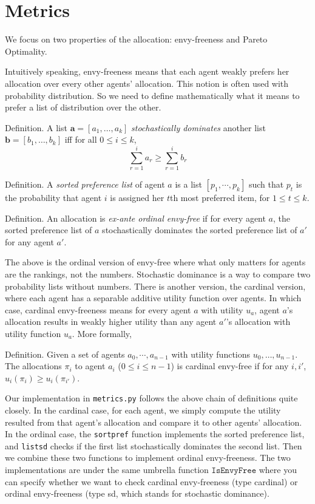 \documentclass[12pt]{article}
\begin{document}
\section*{Metrics}

We focus on two properties of the allocation: envy-freeness and Pareto Optimality. 

Intuitively speaking, envy-freeness means that each agent weakly prefers her allocation over every other agents' allocation. This notion is often used with probability distribution. So we need to define mathematically what it means to prefer a list of distribution over the other.

Definition. A list $\mathbf{a} = [a_1, \dots, a_k]$ \textit{stochastically dominates} another list $\mathbf{b} = [b_1, \dots, b_k]$ iff for all $0 \leq i \leq k$, $$ \sum_{r=1}^i a_r \geq \sum_{r=1}^i b_r $$

Definition. A \textit{sorted preference list} of agent $a$ is a list $[p_1, \cdots, p_k]$ such that $p_t$ is the probability that agent $i$ is assigned her $t$th most preferred item, for $1 \leq t \leq k$.

Definition. An allocation is \textit{ex-ante ordinal envy-free} if for every agent $a$, the sorted preference list of $a$ stochastically dominates the sorted preference list of $a'$ for any agent $a'$.

The above is the ordinal version of envy-free where what only matters for agents are the rankings, not the numbers. Stochastic dominance is a way to compare two probability lists without numbers. There is another version, the cardinal version, where each agent has a separable additive utility function over agents. In which case, cardinal envy-freeness means for every agent $a$ with utility $u_a$, agent $a$'s allocation results in weakly higher utility than any agent $a'$'s allocation with utility function $u_a$. More formally,

Definition. Given a set of agents $a_0,\cdots,a_{n-1}$ with utility functions $u_0,\dots,u_{n-1}$. The allocations $\pi_i$ to agent $a_i$ ($0 \leq i \leq n-1$) is cardinal envy-free if for any $i,i'$, $u_i(\pi_i) \geq u_i(\pi_{i'})$.

Our implementation in \texttt{metrics.py} follows the above chain of definitions quite closely. In the cardinal case, for each agent, we simply compute the utility resulted from  that agent's allocation and compare it to other agents' allocation. In the ordinal case, the \texttt{sort\textunderscore pref} function implements the sorted preference list, and \texttt{list\textunderscore sd} checks if the first list stochastically dominates the second list. Then we combine these two functions to implement ordinal envy-freeness. The two implementations are under the same umbrella function $\texttt{IsEnvyFree}$ where you can specify whether we want to check cardinal envy-freeness (type cardinal) or ordinal envy-freeness (type sd, which stands for stochastic dominance).
\end{document}
